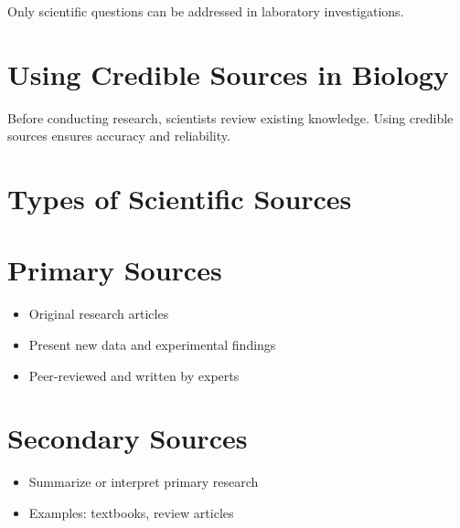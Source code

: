 \documentclass[
  letterpaper,
  DIV=11,
  numbers=noendperiod]{scrreprt}
\begin{document}
Only scientific questions can be addressed in laboratory investigations.

\section*{\texorpdfstring{\textbf{Using Credible Sources in
Biology}}{Using Credible Sources in Biology}}\label{using-credible-sources-in-biology}


Before conducting research, scientists review existing knowledge. Using
credible sources ensures accuracy and reliability.

\section*{\texorpdfstring{\textbf{Types of Scientific
Sources}}{Types of Scientific Sources}}\label{types-of-scientific-sources}


\section*{\texorpdfstring{\textbf{Primary
Sources}}{Primary Sources}}\label{primary-sources}


\begin{itemize}
\item
  Original research articles
\item
  Present new data and experimental findings
\item
  Peer-reviewed and written by experts
\end{itemize}

\section*{\texorpdfstring{\textbf{Secondary
Sources}}{Secondary Sources}}\label{secondary-sources}


\begin{itemize}
\item
  Summarize or interpret primary research
\item
  Examples: textbooks, review articles
\end{itemize}
\end{document}
